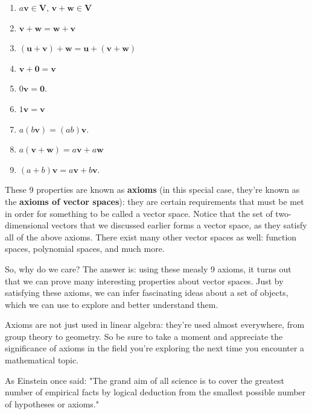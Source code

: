 \documentclass{article}
\begin{document}
\begin{enumerate}
    \item $a\mathbf{v}\in\mathbf{V}$, $\mathbf{v}+\mathbf{w}\in\mathbf{V}$

    \item $\mathbf{v}+\mathbf{w}=\mathbf{w}+\mathbf{v}$

    \item $(\mathbf{u}+\mathbf{v})+\mathbf{w}=\mathbf{u}+(\mathbf{v}+\mathbf{w})$

    \item $\mathbf{v}+\mathbf{0}=\mathbf{v}$

    \item $0\mathbf{v}=\mathbf{0}$.

    \item $1\mathbf{v}=\mathbf{v}$

    \item $a(b\mathbf{v})=(ab)\mathbf{v}$.

    \item $a(\mathbf{v}+\mathbf{w})=a\mathbf{v}+a\mathbf{w}$

    \item $(a+b)\mathbf{v}=a\mathbf{v}+b\mathbf{v}$.
\end{enumerate}

These 9 properties are known as \textbf{axioms} (in this special case, they're known as the \textbf{axioms of vector spaces}): they are certain requirements that must be met in order for something to be called a vector space. Notice that the set of two-dimensional vectors that we discussed earlier forms a vector space, as they satisfy all of the above axioms. There exist many other vector spaces as well: function spaces, polynomial spaces, and much more.

So, why do we care? The answer is: using these measly 9 axioms, it turns out that we can prove many interesting properties about vector spaces. Just by satisfying these axioms, we can infer fascinating ideas about a set of objects, which we can use to explore and better understand them.

Axioms are not just used in linear algebra: they're used almost everywhere, from group theory to geometry. So be sure to take a moment and appreciate the significance of axioms in the field you're exploring the next time you encounter a mathematical topic.

As Einstein once said: "The grand aim of all science is to cover the greatest number of empirical facts by logical deduction from the smallest possible number of hypotheses or axioms."
\end{document}
